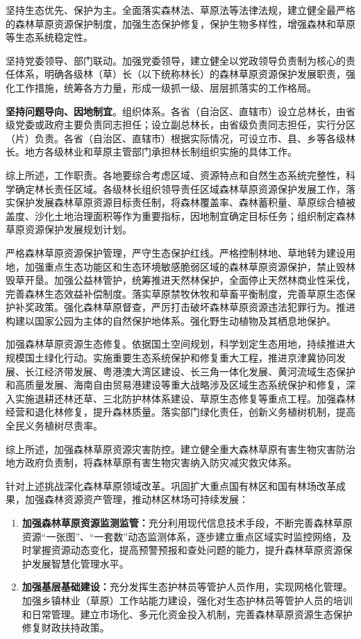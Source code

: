 坚持生态优先、保护为主。全面落实森林法、草原法等法律法规，建立健全最严格的森林草原资源保护制度，加强生态保护修复，保护生物多样性，增强森林和草原等生态系统稳定性。


坚持党委领导、部门联动。加强党委领导，建立健全以党政领导负责制为核心的责任体系，明确各级林（草）长（以下统称林长）的森林草原资源保护发展职责，强化工作措施，统筹各方力量，形成一级抓一级、层层抓落实的工作格局。

\textbf{坚持问题导向、因地制宜}。组织体系。各省（自治区、直辖市）设立总林长，由省级党委或政府主要负责同志担任；设立副总林长，由省级负责同志担任，实行分区（片）负责。各省（自治区、直辖市）根据实际情况，可设立市、县、乡等各级林长。地方各级林业和草原主管部门承担林长制组织实施的具体工作。

综上所述，工作职责。各地要综合考虑区域、资源特点和自然生态系统完整性，科学确定林长责任区域。各级林长组织领导责任区域森林草原资源保护发展工作，落实保护发展森林草原资源目标责任制，将森林覆盖率、森林蓄积量、草原综合植被盖度、沙化土地治理面积等作为重要指标，因地制宜确定目标任务；组织制定森林草原资源保护发展规划计划。


严格森林草原资源保护管理，严守生态保护红线。严格控制林地、草地转为建设用地，加强重点生态功能区和生态环境敏感脆弱区域的森林草原资源保护，禁止毁林毁草开垦。加强公益林管护，统筹推进天然林保护，全面停止天然林商业性采伐，完善森林生态效益补偿制度。落实草原禁牧休牧和草畜平衡制度，完善草原生态保护补奖政策。强化森林草原督查，严厉打击破坏森林草原资源违法犯罪行为。推进构建以国家公园为主体的自然保护地体系。强化野生动植物及其栖息地保护。

加强森林草原资源生态修复。依据国土空间规划，科学划定生态用地，持续推进大规模国土绿化行动。实施重要生态系统保护和修复重大工程，推进京津冀协同发展、长江经济带发展、粤港澳大湾区建设、长三角一体化发展、黄河流域生态保护和高质量发展、海南自由贸易港建设等重大战略涉及区域生态系统保护和修复，深入实施退耕还林还草、三北防护林体系建设、草原生态修复等重点工程。加强森林经营和退化林修复，提升森林质量。落实部门绿化责任，创新义务植树机制，提高全民义务植树尽责率。

综上所述，加强森林草原资源灾害防控。建立健全重大森林草原有害生物灾害防治地方政府负责制，将森林草原有害生物灾害纳入防灾减灾救灾体系。

针对上述挑战深化森林草原领域改革。巩固扩大重点国有林区和国有林场改革成果，加强森林资源资产管理，推动林区林场可持续发展：

\begin{enumerate}
    \item \textbf{加强森林草原资源监测监管：}充分利用现代信息技术手段，不断完善森林草原资源“一张图”、“一套数”动态监测体系，逐步建立重点区域实时监控网络，及时掌握资源动态变化，提高预警预报和查处问题的能力，提升森林草原资源保护发展智慧化管理水平。
    \item \textbf{加强基层基础建设：}充分发挥生态护林员等管护人员作用，实现网格化管理。加强乡镇林业（草原）工作站能力建设，强化对生态护林员等管护人员的培训和日常管理。建立市场化、多元化资金投入机制，完善森林草原资源生态保护修复财政扶持政策。
\end{enumerate}